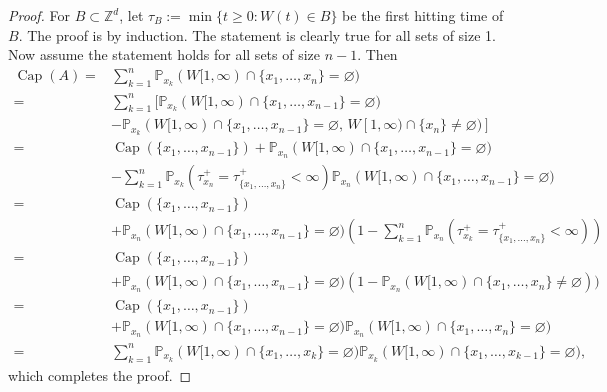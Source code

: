\documentclass[10pt,a4paper]{amsart}
\DeclareMathOperator{\Ca}{Cap}
\renewcommand{\P}{\mathbb{P}}
\newcommand{\Z}{\mathbb{Z}}
\begin{document}
\begin{proof}
For $B\subset\Z^d$, let $\tau_B:=\min\{t\geq0\colon W(t)\in B\}$ be the first hitting time of $B$. The proof is by induction. The statement is clearly true for all sets of size 1. Now assume the statement holds for all sets of size $n-1$. Then
\begin{equation}
    \begin{split}
        \Ca(A)=&\sum_{k=1}^n\P_{x_k}(W[1,\infty)\cap\{x_1,\ldots,x_n\}=\varnothing)\\
        =&\sum_{k=1}^n[\P_{x_k}(W[1,\infty)\cap\{x_1,\ldots,x_{n-1}\}
        =\varnothing)\\
        &-\P_{x_k}(W[1,\infty)\cap\{x_1,\ldots,x_{n-1}\}=\varnothing,\,W[1,\infty)\cap\{x_n\}\neq\varnothing)]\\
        =&\Ca(\{x_1,\ldots,x_{n-1}\})+\P_{x_n}(W[1,\infty)\cap\{x_1,\ldots,x_{n-1}\}=\varnothing)\\
        &-\sum_{k=1}^n\P_{x_k}(\tau^+_{x_n}=\tau^+_{\{x_1,\ldots,x_{n}\}}<\infty)\P_{x_n}(W[1,\infty)\cap\{x_1,\ldots,x_{n-1}\}=\varnothing)\\
        =&\Ca(\{x_1,\ldots,x_{n-1}\})\\
        &+\P_{x_n}(W[1,\infty)\cap\{x_1,\ldots,x_{n-1}\}=\varnothing)\left(1-\sum_{k=1}^n\P_{x_n}(\tau_{x_k}^+=\tau_{\{x_1,\ldots,x_n\}}^+<\infty)\right)\\
        =&\Ca(\{x_1,\ldots,x_{n-1}\})\\
        &+\P_{x_n}(W[1,\infty)\cap\{x_1,\ldots,x_{n-1}\}=\varnothing)(1-\P_{x_n}(W[1,\infty)\cap\{x_1,\ldots,x_{n}\}\neq\varnothing))\\
        =&\Ca(\{x_1,\ldots,x_{n-1}\})\\
        &+\P_{x_n}(W[1,\infty)\cap\{x_1,\ldots,x_{n-1}\}=\varnothing)\P_{x_n}(W[1,\infty)\cap\{x_1,\ldots,x_{n}\}=\varnothing)\\
        =&\sum_{k=1}^n\P_{x_k}(W[1,\infty)\cap\{x_1,\ldots,x_k\}=\varnothing)\P_{x_k}(W[1,\infty)\cap\{x_1,\ldots,x_{k-1}\}=\varnothing),
    \end{split}
\end{equation}
which completes the proof.
\end{proof}
\end{document}
